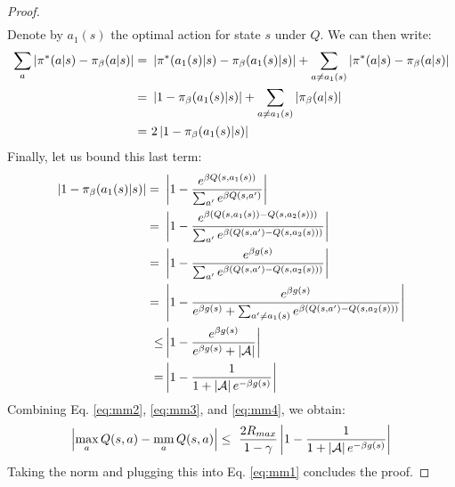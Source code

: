 \documentclass{article}
\newcommand{\mm}{\operatornamewithlimits{mm}}
\newcommand{\abs}[1]{\left\lvert #1 \right\rvert}
\begin{document}
\begin{proof}
\begin{align*}
\end{align*}
Denote by $a_1(s)$ the optimal action for state $s$ under $Q$. We can then write:
\begin{align} \label{eq:mm3}
\sum_a\abs{\pi^*(a|s) - \pi_{\beta}(a|s)} =\ & \abs{\pi^*(a_1(s)|s) - \pi_{\beta}(a_1(s)|s)} + \sum_{a \neq a_1(s)}\abs{\pi^*(a|s) - \pi_{\beta}(a|s)}\notag\\ =\ & \abs{1 - \pi_{\beta}(a_1(s)|s)} + \sum_{a \neq a_1(s)}\abs{\pi_{\beta}(a|s)}\notag\\ =\ & 2\abs{1 - \pi_{\beta}(a_1(s)|s)}
\end{align}
Finally, let us bound this last term:
\begin{align} \label{eq:mm4}
\abs{1 - \pi_{\beta}(a_1(s)|s)} =\ & \abs{1 - \frac{e^{\beta Q(s,a_1(s))}}{\sum_{a'}e^{\beta Q(s,a')}}}\notag\\ =\ & \abs{1 - \frac{e^{\beta \left( Q(s,a_1(s)) - Q(s,a_2(s)) \right)}}{\sum_{a'}e^{\beta \left( Q(s,a') - Q(s,a_2(s))\right)}}}\notag\\ =\ & \abs{1 - \frac{e^{\beta g(s)}}{\sum_{a'}e^{\beta \left( Q(s,a') - Q(s,a_2(s))\right)}}}\notag\\ =\ & \abs{1 - \frac{e^{\beta g(s)}}{e^{\beta g(s)} + \sum_{a' \neq a_1(s)}e^{\beta \left( Q(s,a') - Q(s,a_2(s))\right)}}}\notag\\ \leq & \abs{1 - \frac{e^{\beta g(s)}}{e^{\beta g(s)} + \abs{\mathcal{A}}}}\notag\\ = & \abs{1 - \frac{1}{1 + \abs{\mathcal{A}}e^{-\beta g(s)}}}
\end{align}
Combining Eq. \eqref{eq:mm2}, \eqref{eq:mm3}, and \eqref{eq:mm4}, we obtain:
\begin{align*}
\abs{\max_a Q(s,a) - \mm_a Q(s,a)} \leq\ \frac{2R_{max}}{1-\gamma}\abs{1 - \frac{1}{1 + \abs{\mathcal{A}}e^{-\beta g(s)}}}
\end{align*}
Taking the norm and plugging this into Eq. \eqref{eq:mm1} concludes the proof.
\end{proof}
\end{document}
